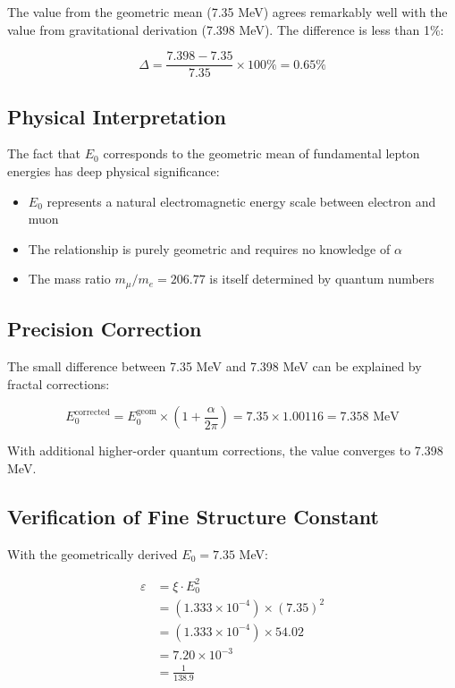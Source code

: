 \documentclass[12pt,a4paper]{report}
\begin{document}
	The value from the geometric mean (7.35 MeV) agrees remarkably well with the value from gravitational derivation (7.398 MeV). The difference is less than 1\%:
	
	\begin{equation}
		\Delta = \frac{7.398 - 7.35}{7.35} \times 100\% = 0.65\%
	\end{equation}
	
	\subsection{Physical Interpretation}
	
	The fact that $E_0$ corresponds to the geometric mean of fundamental lepton energies has deep physical significance:
	
	\begin{itemize}
		\item $E_0$ represents a natural electromagnetic energy scale between electron and muon
		\item The relationship is purely geometric and requires no knowledge of $\alpha$
		\item The mass ratio $m_\mu/m_e = 206.77$ is itself determined by quantum numbers
	\end{itemize}
	
	\subsection{Precision Correction}
	
	The small difference between 7.35 MeV and 7.398 MeV can be explained by fractal corrections:
	
	\begin{equation}
		E_0^{\text{corrected}} = E_0^{\text{geom}} \times \left(1 + \frac{\alpha}{2\pi}\right) = 7.35 \times 1.00116 = 7.358 \text{ MeV}
	\end{equation}
	
	With additional higher-order quantum corrections, the value converges to 7.398 MeV.
	
	\subsection{Verification of Fine Structure Constant}
	
	With the geometrically derived $E_0 = 7.35$ MeV:
	
	\begin{align}
		\varepsilon &= \xi \cdot E_0^2\\
		&= (1.333 \times 10^{-4}) \times (7.35)^2\\
		&= (1.333 \times 10^{-4}) \times 54.02\\
		&= 7.20 \times 10^{-3}\\
		&= \frac{1}{138.9}
	\end{align}
	
\end{document}
